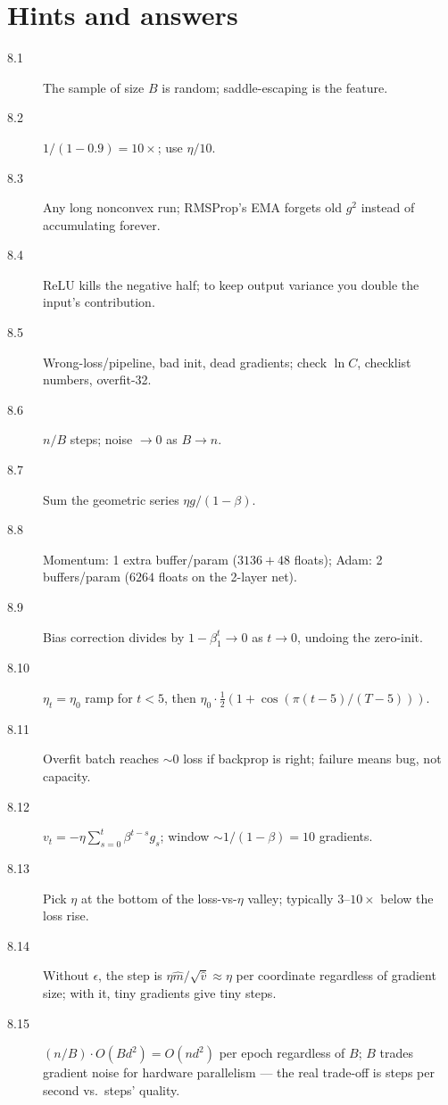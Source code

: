 \section*{Hints and answers}
\begin{description}
\item[8.1] The sample of size $B$ is random; saddle-escaping is the
feature.
\item[8.2] $1/(1-0.9)=10\times$; use $\eta/10$.
\item[8.3] Any long nonconvex run; RMSProp's EMA forgets old
$g^2$ instead of accumulating forever.
\item[8.4] ReLU kills the negative half; to keep output variance you
double the input's contribution.
\item[8.5] Wrong-loss/pipeline, bad init, dead gradients; check
$\ln C$, checklist numbers, overfit-32.
\item[8.6] $n/B$ steps; noise $\to 0$ as $B\to n$.
\item[8.7] Sum the geometric series $\eta g/(1-\beta)$.
\item[8.8] Momentum: 1 extra buffer/param ($3136+48$ floats); Adam:
2 buffers/param ($6264$ floats on the 2-layer net).
\item[8.9] Bias correction divides by $1-\beta_1^t\to0$ as
$t\to0$, undoing the zero-init.
\item[8.10] $\eta_t=\eta_0$ ramp for $t<5$, then
$\eta_0\cdot\frac{1}{2}(1+\cos(\pi(t-5)/(T-5)))$.
\item[8.11] Overfit batch reaches $\sim0$ loss if backprop is right;
failure means bug, not capacity.
\item[8.12] $v_t=-\eta\sum_{s=0}^t\beta^{t-s}g_s$; window
$\sim1/(1-\beta)=10$ gradients.
\item[8.13] Pick $\eta$ at the bottom of the loss-vs-$\eta$ valley;
typically $3$--$10\times$ below the loss rise.
\item[8.14] Without $\epsilon$, the step is $\eta\hat m/\sqrt{\hat
v}\approx\eta$ per coordinate regardless of gradient size; with it,
tiny gradients give tiny steps.
\item[8.15] $(n/B)\cdot O(Bd^2)=O(nd^2)$ per epoch regardless of $B$;
$B$ trades gradient noise for hardware parallelism --- the real
trade-off is steps per second vs.\ steps' quality.
\end{description}
